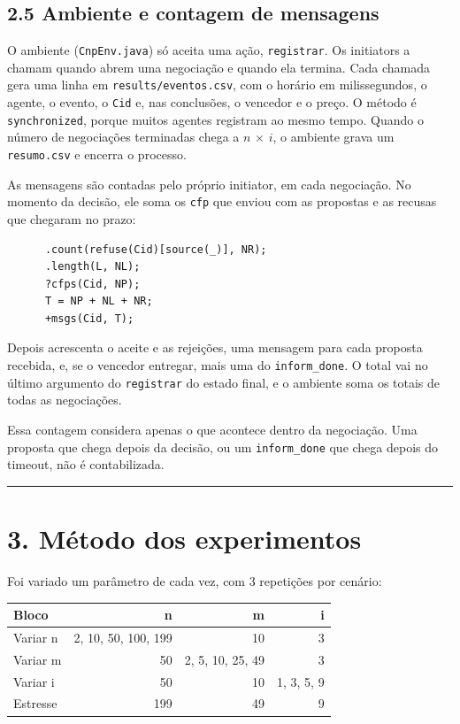 \documentclass[11pt,a4paper]{article}
\newcommand{\cod}[1]{\texttt{#1}}
\newcommand{\separador}{\begin{center}\rule{0.45\linewidth}{0.4pt}\end{center}}
\begin{document}
\subsection*{2.5 Ambiente e contagem de mensagens}

O ambiente (\cod{CnpEnv.java}) só aceita uma ação, \cod{registrar}. Os initiators a chamam quando abrem uma negociação e quando ela termina. Cada chamada gera uma linha em \cod{results/eventos.csv}, com o horário em milissegundos, o agente, o evento, o \cod{Cid} e, nas conclusões, o vencedor e o preço. O método é \cod{synchronized}, porque muitos agentes registram ao mesmo tempo. Quando o número de negociações terminadas chega a $n$ $\times$ $i$, o ambiente grava um \cod{resumo.csv} e encerra o processo.

As mensagens são contadas pelo próprio initiator, em cada negociação. No momento da decisão, ele soma os \cod{cfp} que enviou com as propostas e as recusas que chegaram no prazo:

\begin{lstlisting}
      .count(refuse(Cid)[source(_)], NR);
      .length(L, NL);
      ?cfps(Cid, NP);
      T = NP + NL + NR;
      +msgs(Cid, T);
\end{lstlisting}

Depois acrescenta o aceite e as rejeições, uma mensagem para cada proposta recebida, e, se o vencedor entregar, mais uma do \cod{inform\_done}. O total vai no último argumento do \cod{registrar} do estado final, e o ambiente soma os totais de todas as negociações.

Essa contagem considera apenas o que acontece dentro da negociação. Uma proposta que chega depois da decisão, ou um \cod{inform\_done} que chega depois do timeout, não é contabilizada.

\separador

\section*{3. Método dos experimentos}

Foi variado um parâmetro de cada vez, com 3 repetições por cenário:

\begin{center}
\begin{tabular}{lrrr}
\toprule
Bloco & n & m & i \\
\midrule
Variar n & 2, 10, 50, 100, 199 & 10 & 3 \\
Variar m & 50 & 2, 5, 10, 25, 49 & 3 \\
Variar i & 50 & 10 & 1, 3, 5, 9 \\
Estresse & 199 & 49 & 9 \\
\bottomrule
\end{tabular}
\end{center}
\end{document}
